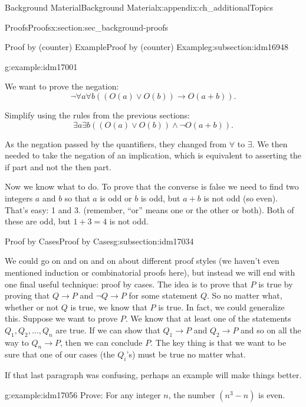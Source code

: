 \documentclass[oneside,10pt,]{book}
\numberwithin{equation}{chapter}
\def\imp{\rightarrow}
\begin{document}
\begin{appendixptx}{Background Material}{}{Background Material}{}{}{x:appendix:ch_additionalTopics}
\begin{sectionptx}{Proofs}{}{Proofs}{}{}{x:section:sec_background-proofs}
\begin{subsectionptx}{Proof by (counter) Example}{}{Proof by (counter) Example}{}{}{g:subsection:idm16948}
\begin{example}{}{g:example:idm17001}
%
\par
We want to prove the negation:%
\begin{equation*}
\neg \forall a \forall b ((O(a) \vee O(b)) \imp O(a+b)).
\end{equation*}
%
\par
Simplify using the rules from the previous sections:%
\begin{equation*}
\exists a \exists b ((O(a) \vee O(b)) \wedge \neg O(a+b)).
\end{equation*}
%
\par
As the negation passed by the quantifiers, they changed from \(\forall\) to \(\exists\). We then needed to take the negation of an implication, which is equivalent to asserting the if part and not the then part.%
\par
Now we know what to do. To prove that the converse is false we need to find two integers \(a\) and \(b\) so that \(a\) is odd or \(b\) is odd, but \(a+b\) is not odd (so even). That's easy: 1 and 3. (remember, ``or'' means one or the other or both). Both of these are odd, but \(1+3 = 4\) is not odd.%
\end{example}
\end{subsectionptx}
%
%
\typeout{************************************************}
\typeout{************************************************}
%
\begin{subsectionptx}{Proof by Cases}{}{Proof by Cases}{}{}{g:subsection:idm17034}
%
\par
We could go on and on and on about different proof styles (we haven't even mentioned induction or combinatorial proofs here), but instead we will end with one final useful technique: proof by cases. The idea is to prove that \(P\) is true by proving that \(Q \imp P\) and \(\neg Q \imp P\) for some statement \(Q\). So no matter what, whether or not \(Q\) is true, we know that \(P\) is true. In fact, we could generalize this. Suppose we want to prove \(P\). We know that at least one of the statements \(Q_1, Q_2, \ldots, Q_n\) are true. If we can show that \(Q_1 \imp P\) and \(Q_2 \imp P\) and so on all the way to \(Q_n \imp P\), then we can conclude \(P\). The key thing is that we want to be sure that one of our cases (the \(Q_i\)'s) must be true no matter what.%
\par
If that last paragraph was confusing, perhaps an example will make things better.%
\begin{example}{}{g:example:idm17056}%
Prove: For any integer \(n\), the number \((n^3 -n)\) is even.%

\end{example}
\end{subsectionptx}
\end{sectionptx}
\end{appendixptx}
\end{document}
